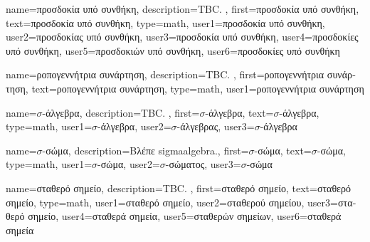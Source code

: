 {name={\foreignlanguage{greek}{προσδοκία υπό συνθήκη}}, 
	description={TBC. }, 
 	first={\foreignlanguage{greek}{προσδοκία υπό συνθήκη}},  
 	text={\foreignlanguage{greek}{προσδοκία υπό συνθήκη}},
	type=math,
	user1={\foreignlanguage{greek}{προσδοκία υπό συνθήκη}}, %
  	user2={\foreignlanguage{greek}{προσδοκίας υπό συνθήκη}}, %
	user3={\foreignlanguage{greek}{προσδοκία υπό συνθήκη}}, %
	user4={\foreignlanguage{greek}{προσδοκίες υπό συνθήκη}}, %
  	user5={\foreignlanguage{greek}{προσδοκιών υπό συνθήκη}}, %
	user6={\foreignlanguage{greek}{προσδοκίες υπό συνθήκη}} %
}%

{name={\foreignlanguage{greek}{ροπογεννήτρια συνάρτηση}}, 
	description={TBC. }, 
 	first={\foreignlanguage{greek}{ροπογεννήτρια συνάρτηση}},
 	text={\foreignlanguage{greek}{ροπογεννήτρια συνάρτηση}},
	type=math,
	user1={\foreignlanguage{greek}{ροπογεννήτρια συνάρτηση}} %
}

{name={\foreignlanguage{greek}{$\sigma$-άλγεβρα}},
	description={TBC. },
	first={\foreignlanguage{greek}{$\sigma$-άλγεβρα}},
	text={\foreignlanguage{greek}{$\sigma$-άλγεβρα}},
	type=math,
	user1={\foreignlanguage{greek}{$\sigma$-άλγεβρα}}, %
  	user2={\foreignlanguage{greek}{$\sigma$-άλγεβρας}}, %
	user3={\foreignlanguage{greek}{$\sigma$-άλγεβρα}} %
}

{name={\foreignlanguage{greek}{$\sigma$-σώμα}}, 
	description={\foreignlanguage{greek}{Βλέπε} \gls{sigmaalgebra}.}, 
	first={\foreignlanguage{greek}{$\sigma$-σώμα}},
	text={\foreignlanguage{greek}{$\sigma$-σώμα}},
	type=math,
	user1={\foreignlanguage{greek}{$\sigma$-σώμα}}, %
  	user2={\foreignlanguage{greek}{$\sigma$-σώματος}}, %
	user3={\foreignlanguage{greek}{$\sigma$-σώμα}} %
}

{name={\foreignlanguage{greek}{σταθερό σημείο}},
	description={TBC. },
	first={\foreignlanguage{greek}{σταθερό σημείο}},
	text={\foreignlanguage{greek}{σταθερό σημείο}},
	type=math,
	user1={\foreignlanguage{greek}{σταθερό σημείο}}, %
  	user2={\foreignlanguage{greek}{σταθερού σημείου}}, %
	user3={\foreignlanguage{greek}{σταθερό σημείο}}, %
	user4={\foreignlanguage{greek}{σταθερά σημεία}}, %
  	user5={\foreignlanguage{greek}{σταθερών σημείων}}, %
	user6={\foreignlanguage{greek}{σταθερά σημεία}} %
}

